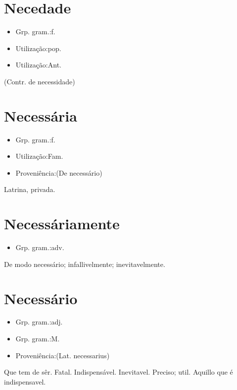 \section{Necedade}
\begin{itemize}
\item {Grp. gram.:f.}
\end{itemize}
\begin{itemize}
\item {Utilização:pop.}
\end{itemize}
\begin{itemize}
\item {Utilização:Ant.}
\end{itemize}
(Contr. de \textunderscore necessidade\textunderscore )
\section{Necessária}
\begin{itemize}
\item {Grp. gram.:f.}
\end{itemize}
\begin{itemize}
\item {Utilização:Fam.}
\end{itemize}
\begin{itemize}
\item {Proveniência:(De \textunderscore necessário\textunderscore )}
\end{itemize}
Latrina, privada.
\section{Necessáriamente}
\begin{itemize}
\item {Grp. gram.:adv.}
\end{itemize}
De modo necessário; infallivelmente; inevitavelmente.
\section{Necessário}
\begin{itemize}
\item {Grp. gram.:adj.}
\end{itemize}
\begin{itemize}
\item {Grp. gram.:M.}
\end{itemize}
\begin{itemize}
\item {Proveniência:(Lat. \textunderscore necessarius\textunderscore )}
\end{itemize}
Que tem de sêr.
Fatal.
Indispensável.
Inevitavel.
Preciso; util.
Aquillo que é indispensavel.
